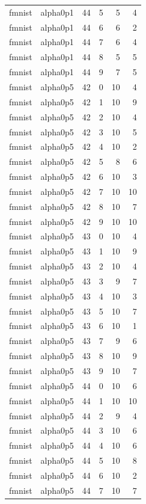 \begin{tabular}{llrrrr}
fmnist & alpha0p1 & 44 & 5 & 5 & 4 \\
fmnist & alpha0p1 & 44 & 6 & 6 & 2 \\
fmnist & alpha0p1 & 44 & 7 & 6 & 4 \\
fmnist & alpha0p1 & 44 & 8 & 5 & 5 \\
fmnist & alpha0p1 & 44 & 9 & 7 & 5 \\
fmnist & alpha0p5 & 42 & 0 & 10 & 4 \\
fmnist & alpha0p5 & 42 & 1 & 10 & 9 \\
fmnist & alpha0p5 & 42 & 2 & 10 & 4 \\
fmnist & alpha0p5 & 42 & 3 & 10 & 5 \\
fmnist & alpha0p5 & 42 & 4 & 10 & 2 \\
fmnist & alpha0p5 & 42 & 5 & 8 & 6 \\
fmnist & alpha0p5 & 42 & 6 & 10 & 3 \\
fmnist & alpha0p5 & 42 & 7 & 10 & 10 \\
fmnist & alpha0p5 & 42 & 8 & 10 & 7 \\
fmnist & alpha0p5 & 42 & 9 & 10 & 10 \\
fmnist & alpha0p5 & 43 & 0 & 10 & 4 \\
fmnist & alpha0p5 & 43 & 1 & 10 & 9 \\
fmnist & alpha0p5 & 43 & 2 & 10 & 4 \\
fmnist & alpha0p5 & 43 & 3 & 9 & 7 \\
fmnist & alpha0p5 & 43 & 4 & 10 & 3 \\
fmnist & alpha0p5 & 43 & 5 & 10 & 7 \\
fmnist & alpha0p5 & 43 & 6 & 10 & 1 \\
fmnist & alpha0p5 & 43 & 7 & 9 & 6 \\
fmnist & alpha0p5 & 43 & 8 & 10 & 9 \\
fmnist & alpha0p5 & 43 & 9 & 10 & 7 \\
fmnist & alpha0p5 & 44 & 0 & 10 & 6 \\
fmnist & alpha0p5 & 44 & 1 & 10 & 10 \\
fmnist & alpha0p5 & 44 & 2 & 9 & 4 \\
fmnist & alpha0p5 & 44 & 3 & 10 & 6 \\
fmnist & alpha0p5 & 44 & 4 & 10 & 6 \\
fmnist & alpha0p5 & 44 & 5 & 10 & 8 \\
fmnist & alpha0p5 & 44 & 6 & 10 & 2 \\
fmnist & alpha0p5 & 44 & 7 & 10 & 7 \\

\end{tabular}
